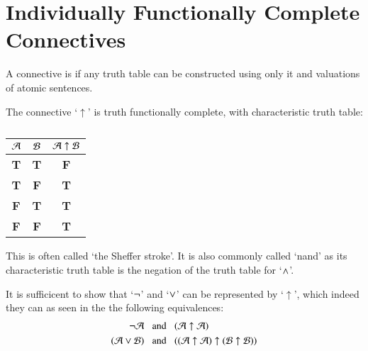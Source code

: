 \documentclass[12pt, a4paper, twoside, openright, titlepage]{book}
\begin{document}
\section{\textsection Individually Functionally Complete Connectives}

\begin{defn}{}{}
    A connective is  if any truth table can be constructed using only it and valuations of atomic sentences.
\end{defn}

\begin{defn}{}{}
    The connective `$\uparrow$' is truth functionally complete, with characteristic truth table: 
        \begin{table}[H]
            \centering
            \caption{}
            \begin{tabular}{cc|c}
                $\mathcal{A}$ & $\mathcal{B}$ & $\mathcal{A} \uparrow \mathcal{B}$\\ \hline
                \textbf{T} & \textbf{T} & \textbf{F} \\
                \textbf{T} & \textbf{F} & \textbf{T} \\
                \textbf{F} & \textbf{T} & \textbf{T} \\
                \textbf{F} & \textbf{F} & \textbf{T}
            \end{tabular}
        \end{table}
        This is often called `the Sheffer stroke'. It is also commonly called `nand' as its characteristic truth table is the negation of the truth table for `$\wedge$'.
\end{defn}
\begin{proof*}{}{}
    It is sufficicent to show that `$\neg$' and `$\vee$' can be represented by `$\uparrow$', which indeed they can as seen in the the following equivalences: 
    \begin{align*}
        \neg\mathcal{A}\;\;&\text{ and }\;\;(\mathcal{A}\uparrow \mathcal{A}) \\
        (\mathcal{A}\vee\mathcal{B})\;\;&\text{ and }\;\;((\mathcal{A}\uparrow\mathcal{A})\uparrow(\mathcal{B}\uparrow\mathcal{B}))
    \end{align*}
\end{proof*}
\end{document}
